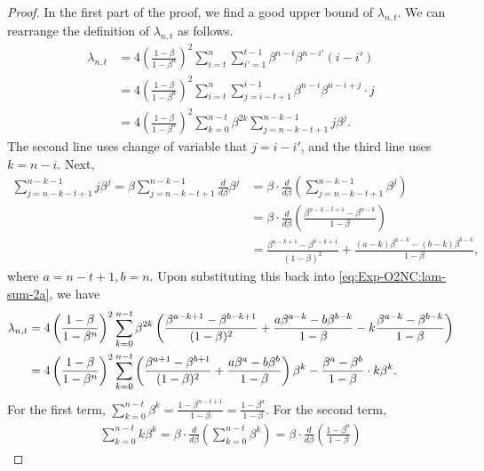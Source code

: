 \begin{proof}
In the first part of the proof, we find a good upper bound of $\lambda_{n,t}$. We can rearrange the definition of $\lambda_{n,t}$ as follows.
\begin{align}
    \lambda_{n,t}
    &= 4\left(\frac{1-\beta}{1-\beta^n}\right)^2 \sum_{i=t}^n\sum_{i'=1}^{t-1} \beta^{n-i}\beta^{n-i'}(i-i') \tag{let $j=i-i'$}\\
    &= 4\left(\frac{1-\beta}{1-\beta^n}\right)^2 \sum_{i=t}^n\sum_{j=i-t+1}^{i-1} \beta^{n-i}\beta^{n-i+j}\cdot j \tag{let $k=n-i$}\\
    &= 4\left(\frac{1-\beta}{1-\beta^n}\right)^2 \sum_{k=0}^{n-t} \beta^{2k} \sum_{j=n-k-t+1}^{n-k-1} j\beta^j.
    \label{eq:Exp-O2NC:lam-sum-2a}
\end{align}
The second line uses change of variable that $j=i-i'$, and the third line uses $k=n-i$. Next, 
\begin{align*}
    \sum_{j=n-k-t+1}^{n-k-1} j\beta^j
    = \beta\sum_{j=n-k-t+1}^{n-k-1} \frac{d}{d\beta} \beta^j 
    &= \beta\cdot \frac{d}{d\beta} \left( \sum_{j=n-k-t+1}^{n-k-1} \beta^j \right) \\
    &= \beta\cdot \frac{d}{d\beta} \left( \frac{\beta^{n-k-t+1} - \beta^{n-k}}{1-\beta} \right) \\
    &= \frac{\beta^{a-k+1}-\beta^{b-k+1}}{(1-\beta)^2} + \frac{(a-k)\beta^{a-k} - (b-k)\beta^{b-k}}{1-\beta},
\end{align*}
where $a=n-t+1, b=n$. Upon substituting this back into \eqref{eq:Exp-O2NC:lam-sum-2a}, we have
\begin{align}
    \lambda_{n,t}
    &= 4\left(\frac{1-\beta}{1-\beta^n}\right)^2 \sum_{k=0}^{n-t} \beta^{2k}\left( \frac{\beta^{a-k+1} - \beta^{b-k+1}}{(1-\beta)^2} + \frac{a\beta^{a-k}-b\beta^{b-k}}{1-\beta} - k \frac{\beta^{a-k}-\beta^{b-k}}{1-\beta} \right) \notag\\
    &= 4\left(\frac{1-\beta}{1-\beta^n}\right)^2 \sum_{k=0}^{n-t} \left( \frac{\beta^{a+1} - \beta^{b+1}}{(1-\beta)^2} + \frac{a\beta^{a}-b\beta^{b}}{1-\beta} \right) \beta^k - \frac{\beta^a-\beta^b}{1-\beta} \cdot k\beta^k.
    \label{eq:Exp-O2NC:lam-sum-2b}
\end{align}
For the first term, $\sum_{k=0}^{n-t}\beta^k = \frac{1-\beta^{n-t+1}}{1-\beta} = \frac{1-\beta^a}{1-\beta}$. For the second term,
\begin{align*}
    \sum_{k=0}^{n-t} k\beta^k
    = \beta \cdot \frac{d}{d\beta} \left( \sum_{k=0}^{n-t}\beta^k \right) 
    = \beta \cdot \frac{d}{d\beta} \left( \frac{1-\beta^a}{1-\beta} \right) 

\end{align*}
\end{proof}
